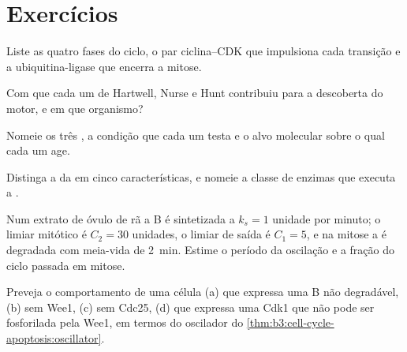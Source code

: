 \section{Exercícios}

\begin{exercise}[$\star$]\label{exo:b3:cell-cycle-apoptosis:1}
Liste as quatro fases do ciclo, o par ciclina--CDK que impulsiona cada
transição e a ubiquitina-ligase que encerra a mitose.
\end{exercise}

\begin{exercise}[$\star$]\label{exo:b3:cell-cycle-apoptosis:2}
Com que cada um de Hartwell, Nurse e Hunt contribuiu para a descoberta
do motor, e em que organismo?
\end{exercise}

\begin{exercise}[$\star$]\label{exo:b3:cell-cycle-apoptosis:3}
Nomeie os três , a condição que cada um testa e o
alvo molecular sobre o qual cada um age.
\end{exercise}

\begin{exercise}[$\star$]\label{exo:b3:cell-cycle-apoptosis:4}
Distinga a  da  em cinco características, e nomeie a
classe de enzimas que executa a .
\end{exercise}

\begin{exercise}[$\star\star$]\label{exo:b3:cell-cycle-apoptosis:5}
Num extrato de óvulo de rã a  B é sintetizada a $k_{s} = 1$
unidade por minuto; o limiar mitótico é $C_{2} = 30$ unidades, o limiar
de saída é $C_{1} = 5$, e na mitose a  é degradada com meia-vida
de \qty{2}{min}. Estime o período da oscilação e a fração do ciclo
passada em mitose.
\end{exercise}

\begin{exercise}[$\star\star$]\label{exo:b3:cell-cycle-apoptosis:6}
Preveja o comportamento de uma célula (a) que expressa uma  B
não degradável, (b) sem Wee1, (c) sem Cdc25, (d) que expressa uma Cdk1
que não pode ser fosforilada pela Wee1, em termos do oscilador do
\cref{thm:b3:cell-cycle-apoptosis:oscillator}.
\end{exercise}

